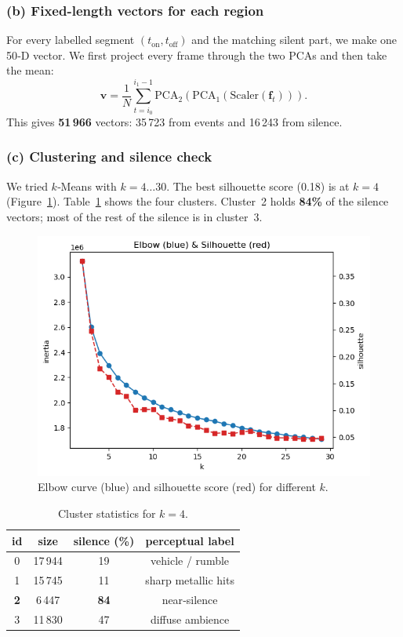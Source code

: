 \documentclass{article}
\begin{document}
\subsubsection{(b) Fixed-length vectors for each region}
For every labelled segment $(t_\text{on}, t_\text{off})$ and the matching silent part, we make one 50‑D vector. We first project every frame through the two PCAs and then take the mean:
\[
\mathbf v = \frac{1}{N}\sum_{t=i_0}^{i_1-1}
\mathrm{PCA}_2(\mathrm{PCA}_1(\mathrm{Scaler}(\mathbf f_t))).
\]
This gives \textbf{51\,966} vectors: 35\,723 from events and 16\,243 from silence.

\subsubsection{(c) Clustering and silence check}
We tried $k$‑Means with $k=4\ldots30$. The best silhouette score (0.18) is at $k=4$ (Figure~\ref{fig:elbow}). Table~\ref{tab:cluster} shows the four clusters. Cluster~2 holds \textbf{84\%} of the silence vectors; most of the rest of the silence is in cluster~3.

\begin{figure}[h]
    \centering
    \includegraphics[width=.55\linewidth]{figs_tang/03_elbow_silhouette.png}
    \caption{Elbow curve (blue) and silhouette score (red) for different $k$.}
    \label{fig:elbow}
\end{figure}

\begin{table}[h]
    \caption{Cluster statistics for $k=4$.}
    \label{tab:cluster}
    \centering
    \begin{tabular}{cccc}
        \toprule
        id & size & silence (\%) & perceptual label \\ \midrule
        0 & 17\,944 & 19 & vehicle / rumble \\
        1 & 15\,745 & 11 & sharp metallic hits \\
        \textbf{2} & 6\,447 & \textbf{84} & near‑silence \\
        3 & 11\,830 & 47 & diffuse ambience \\ \bottomrule
    \end{tabular}
\end{table}
\end{document}

